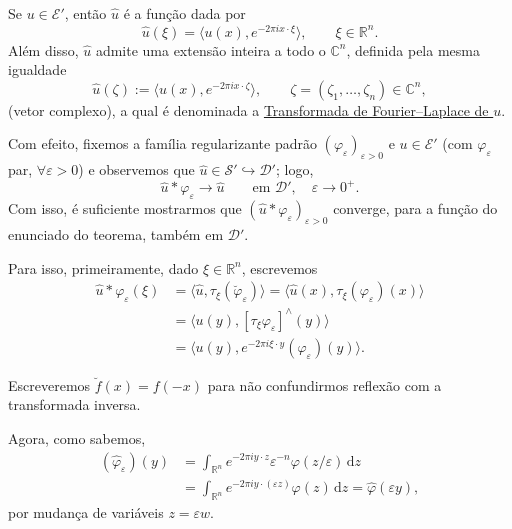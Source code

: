 \documentclass[../distribution_theory_notes.tex]{subfiles}
\begin{document}
\begin{theorem*}
	Se \(u\in\mathcal{E}'\), então \(\hat u\) é a função dada por
	\[
		\hat u(\xi)=\langle u(x),e^{-2\pi i x\cdot\xi}\rangle,
		\qquad \xi\in\mathbb{R}^n.
	\]
	Além disso, \(\hat u\) admite uma extensão inteira a todo o \(\mathbb{C}^n\), definida pela mesma igualdade
	\[
		\hat u(\zeta):=\langle u(x),e^{-2\pi i x\cdot\zeta}\rangle,
		\qquad \zeta=(\zeta_1,\ldots,\zeta_n)\in\mathbb{C}^n,
	\]
	(vetor complexo), a qual é denominada a \underline{Transformada de Fourier--Laplace de \(u\)}.
\end{theorem*}
\begin{proof*}
	Com efeito, fixemos a família regularizante padrão \((\varphi_\varepsilon)_{\varepsilon>0}\) e \(u\in\mathcal{E}'\) (com \(\varphi_\varepsilon\) par, \(\forall \varepsilon>0\)) e observemos que \(\hat u\in\mathcal{S}'\hookrightarrow\mathcal{D}'\); logo,
	\[
		\hat u*\varphi_\varepsilon\longrightarrow\hat u
		\qquad\text{em }\mathcal{D}',\quad \varepsilon\to0^+.
	\]
	Com isso, é suficiente mostrarmos que \((\hat u*\varphi_\varepsilon)_{\varepsilon>0}\) converge, para a função do enunciado do teorema, também em \(\mathcal{D}'\).

	Para isso, primeiramente, dado \(\xi\in\mathbb{R}^n\), escrevemos
	\begin{align*}
		\hat u*\varphi_\varepsilon(\xi)
		 & =\bigl\langle \hat u,\tau_\xi(\breve\varphi_\varepsilon)\bigr\rangle
		=\bigl\langle \hat u(x),\tau_\xi(\varphi_\varepsilon)(x)\bigr\rangle                 \\
		 & =\bigl\langle u(y),[\tau_\xi\varphi_\varepsilon]^\wedge(y)\bigr\rangle            \\
		 & =\bigl\langle u(y),e^{-2\pi i\xi\cdot y}(\hat\varphi_\varepsilon)(y)\bigr\rangle.
	\end{align*}

	\begin{tcolorbox}[
			skin=enhanced,
			title=Notação,
			fonttitle=\bfseries,
			colframe=black,
			colbacktitle=cyan!75!white,
			colback=cyan!15,
			colbacklower=black,
			coltitle=black,
			drop fuzzy shadow
		]
		Escreveremos \(\breve f(x)=f(-x)\) para não confundirmos reflexão com a transformada inversa.
	\end{tcolorbox}

	Agora, como sabemos,
	\begin{align*}
		(\hat\varphi_\varepsilon)(y)
		 & =\int_{\mathbb{R}^n}e^{-2\pi i y\cdot z}\varepsilon^{-n}\varphi(z/\varepsilon)\,\mathrm{d}z \\
		 & =\int_{\mathbb{R}^n}e^{-2\pi i y\cdot(\varepsilon z)}\varphi(z)\,\mathrm{d}z
		=\hat\varphi(\varepsilon y),
	\end{align*}
	por mudança de variáveis \(z=\varepsilon w\).


\end{proof*}
\end{document}
